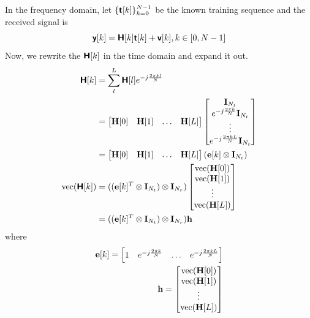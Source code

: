 \documentclass{book}
\begin{document}
    In the frequency domain, let $\{{\bm{\mathsf{t}}}[k]\}_{k=0}^{N-1}$ be the known training sequence and the received signal is
    \begin{equation}\label{eq1}
        {\bm{\mathsf{y}}}[k] = \bm{\mathsf{H}}[k]{\bm{\mathsf{t}}}[k] + {\bm{\mathsf{v}}}[k], k\in [0,N-1]
    \end{equation}
    Now, we rewrite the $\bm{\mathsf{H}}[k]$ in the time domain and expand it out. 
    \begin{align}
        \bm{\mathsf{H}}[k] &= \sum_l^L \bm{\mathsf{H}}[l]e^{-j\frac{2\pi kl}{N}} \\ 
                 &= 
                 \begin{bmatrix}
                    {\mathbf{H}}[0] & {\mathbf{H}}[1] &  \hdots & {\mathbf{H}}[L]
                 \end{bmatrix}
                 \begin{bmatrix}
                    {\mathbf{I}}_{N_t} \\ 
                    e^{-j\frac{2\pi k}{N}}{\mathbf{I}}_{N_t} \\ 
                    \vdots \\ 
                    e^{-j\frac{2\pi kL}{N}}{\mathbf{I}}_{N_t}
                 \end{bmatrix} \\
                 &= \begin{bmatrix}
                    {\mathbf{H}}[0] & {\mathbf{H}}[1] &  \hdots & {\mathbf{H}}[L]
                 \end{bmatrix}
                 ({\mathbf{e}}[k] \otimes {\mathbf{I}}_{N_t}) \\
   \mathrm{vec}(\bm{\mathsf{H}}[k]) &= (({\mathbf{e}}[k]^T \otimes {\mathbf{I}}_{N_t}) \otimes {\mathbf{I}}_{N_r}) 
                    \begin{bmatrix}
                        \mathrm{vec}({\mathbf{H}}[0]) \\
                        \mathrm{vec}({\mathbf{H}}[1]) \\
                        \vdots \\ 
                        \mathrm{vec}({\mathbf{H}}[L])
                    \end{bmatrix} \\
                &= (({\mathbf{e}}[k]^T \otimes {\mathbf{I}}_{N_t}) \otimes {\mathbf{I}}_{N_r}) {\mathbf{h}} \label{eq2}
    \end{align}
    where 
    \begin{align}
        {\mathbf{e}}[k] = \begin{bmatrix}
            1 & e^{-j\frac{2\pi k}{N}} & \hdots & e^{-j\frac{2\pi kL}{N}} 
        \end{bmatrix} \\ 
        {\mathbf{h}} = \begin{bmatrix}
                        \mathrm{vec}({\mathbf{H}}[0]) \\
                        \mathrm{vec}({\mathbf{H}}[1]) \\
                        \vdots \\ 
                        \mathrm{vec}({\mathbf{H}}[L])
             \end{bmatrix}
    \end{align}
\end{document}

